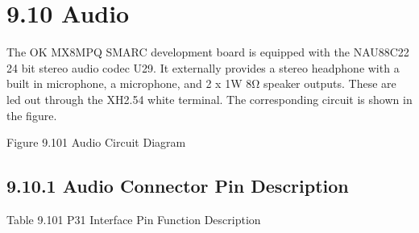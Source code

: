 \documentclass[letterpaper,10pt,openany,english]{sphinxmanual}
\begin{document}
\section{9.10 Audio}
\label{\detokenize{hardware:id27}}
\sphinxAtStartPar
The OK \sphinxhyphen{} MX8MPQ \sphinxhyphen{} SMARC development board is equipped with the NAU88C22 24 \sphinxhyphen{} bit stereo audio codec U29. It externally provides a stereo headphone with a built \sphinxhyphen{} in microphone, a microphone, and 2 x 1W 8Ω speaker outputs. These are led out through the XH2.54 white terminal. The corresponding circuit is shown in the figure.

\sphinxAtStartPar
{}

\sphinxAtStartPar
Figure 9.10\sphinxhyphen{}1 Audio Circuit Diagram


\subsection{9.10.1 Audio Connector Pin Description}
\label{\detokenize{hardware:audio-connector-pin-description}}
\sphinxAtStartPar
Table 9.10\sphinxhyphen{}1 P31 Interface Pin Function Description
\end{document}
